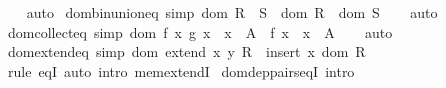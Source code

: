 \begin{isabellebody}
%
\isadelimproof
\ \ %
\endisadelimproof
%
\isatagproof
{}\isamarkupfalse%
\ auto%
\endisatagproof
{\isafoldproof}%
%
\isadelimproof
\isanewline
%
\endisadelimproof
\isanewline
{}\isamarkupfalse%
\ dom{\isacharunderscore}{\kern0pt}bin{\isacharunderscore}{\kern0pt}union{\isacharunderscore}{\kern0pt}eq\ {\isacharbrackleft}{\kern0pt}simp{\isacharbrackright}{\kern0pt}{\isacharcolon}{\kern0pt}\ {\isachardoublequoteopen}dom\ {\isacharparenleft}{\kern0pt}R\ {\isasymunion}\ S{\isacharparenright}{\kern0pt}\ {\isacharequal}{\kern0pt}\ dom\ R\ {\isasymunion}\ dom\ S{\isachardoublequoteclose}\isanewline
%
\isadelimproof
\ \ %
\endisadelimproof
%
\isatagproof
{}\isamarkupfalse%
\ auto%
\endisatagproof
{\isafoldproof}%
%
\isadelimproof
\isanewline
%
\endisadelimproof
\isanewline
{}\isamarkupfalse%
\ dom{\isacharunderscore}{\kern0pt}collect{\isacharunderscore}{\kern0pt}eq\ {\isacharbrackleft}{\kern0pt}simp{\isacharbrackright}{\kern0pt}{\isacharcolon}{\kern0pt}\ {\isachardoublequoteopen}dom\ {\isacharbraceleft}{\kern0pt}{\isasymlangle}f\ x{\isacharcomma}{\kern0pt}\ g\ x{\isasymrangle}\ {\isacharbar}{\kern0pt}\ x\ {\isasymin}\ A{\isacharbraceright}{\kern0pt}\ {\isacharequal}{\kern0pt}\ {\isacharbraceleft}{\kern0pt}f\ x\ {\isacharbar}{\kern0pt}\ x\ {\isasymin}\ A{\isacharbraceright}{\kern0pt}{\isachardoublequoteclose}\isanewline
%
\isadelimproof
\ \ %
\endisadelimproof
%
\isatagproof
{}\isamarkupfalse%
\ auto%
\endisatagproof
{\isafoldproof}%
%
\isadelimproof
\isanewline
%
\endisadelimproof
\isanewline
{}\isamarkupfalse%
\ dom{\isacharunderscore}{\kern0pt}extend{\isacharunderscore}{\kern0pt}eq\ {\isacharbrackleft}{\kern0pt}simp{\isacharbrackright}{\kern0pt}{\isacharcolon}{\kern0pt}\ {\isachardoublequoteopen}dom\ {\isacharparenleft}{\kern0pt}extend\ x\ y\ R{\isacharparenright}{\kern0pt}\ {\isacharequal}{\kern0pt}\ insert\ x\ {\isacharparenleft}{\kern0pt}dom\ R{\isacharparenright}{\kern0pt}{\isachardoublequoteclose}\isanewline
%
\isadelimproof
\ \ %
\endisadelimproof
%
\isatagproof
{}\isamarkupfalse%
\ {\isacharparenleft}{\kern0pt}rule\ eqI{\isacharparenright}{\kern0pt}\ {\isacharparenleft}{\kern0pt}auto\ intro{\isacharcolon}{\kern0pt}\ mem{\isacharunderscore}{\kern0pt}extendI{\isacharprime}{\kern0pt}{\isacharparenright}{\kern0pt}%
\endisatagproof
{\isafoldproof}%
%
\isadelimproof
\isanewline
%
\endisadelimproof
\isanewline
{}\isamarkupfalse%
\ dom{\isacharunderscore}{\kern0pt}dep{\isacharunderscore}{\kern0pt}pairs{\isacharunderscore}{\kern0pt}eqI\ {\isacharbrackleft}{\kern0pt}intro{\isacharbrackright}{\kern0pt}{\isacharcolon}{\kern0pt}\isanewline

\end{isabellebody}
